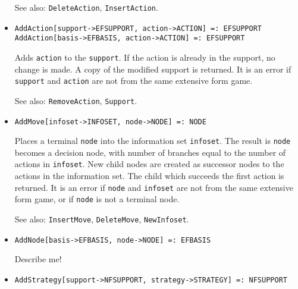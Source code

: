\begin{itemize}
\bd
Returns the list of actions available at \verb+infoset+ in
\verb+support+ or \verb+EFSUPPORT.  If \verb+infoset+ is the null
information set, the empty list of actions is returned.  It is an
error if \verb+infoset+ and \verb+support+ are not from the same
extensive form game.

\item [See also:] \verb+DeleteAction+, \verb+InsertAction+.
\ed

\item{}
\protect \large \begin{verbatim} 
AddAction[support->EFSUPPORT, action->ACTION] =: EFSUPPORT 
AddAction[basis->EFBASIS, action->ACTION] =: EFSUPPORT 
\end{verbatim}\normalsize

\bd 
Adds \verb+action+ to the \verb+support+.  If the action is already in
the support, no change is made.  A copy of the modified support is
returned.  It is an error if \verb+support+ and \verb+action+ are not from the
same extensive form game.

\item [See also:] \verb+RemoveAction+, \verb+Support+.
\ed

\item{}
\protect \large \begin{verbatim} 
AddMove[infoset->INFOSET, node->NODE] =: NODE 
\end{verbatim}\normalsize

\bd
Places a terminal \verb+node+ into the information set
\verb+infoset+.  The result is \verb+node+ becomes a decision node,
with number of branches equal to the number of actions in \verb+infoset+.
New child nodes are created as successor nodes to the actions in the
information set.  The child which succeeds the first action is returned.
It is an error if \verb+node+ and \verb+infoset+ are not from the same
extensive form game, or if \verb+node+ is not a terminal node.

\item [See also:] \verb+InsertMove+, \verb+DeleteMove+,
\verb+NewInfoset+.  
\ed

\item{}
\protect \large \begin{verbatim}
AddNode[basis->EFBASIS, node->NODE] =: EFBASIS
\end{verbatim}\normalsize

\bd
Describe me!
\ed

\item{}
\protect \large \begin{verbatim}
AddStrategy[support->NFSUPPORT, strategy->STRATEGY] =: NFSUPPORT 
\end{verbatim}\normalsize


\end{itemize}
